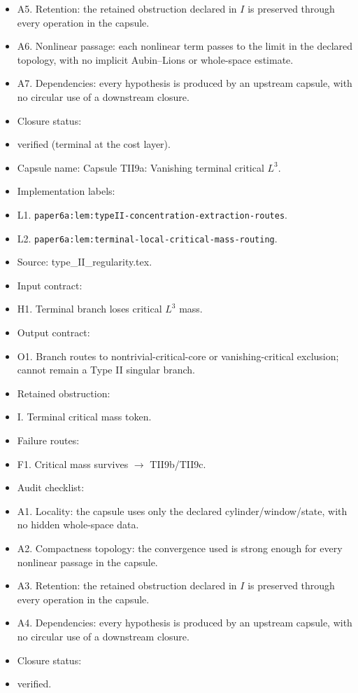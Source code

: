 \documentclass[11pt]{amsart}
\begin{document}
\begin{itemize}
  \item A5. Retention: the retained obstruction declared in $I$ is preserved through every operation in the capsule.
  \item A6. Nonlinear passage: each nonlinear term passes to the limit in the declared topology, with no implicit Aubin--Lions or whole-space estimate.
  \item A7. Dependencies: every hypothesis is produced by an upstream capsule, with no circular use of a downstream closure.
  \item Closure status:
  \item verified (terminal at the cost layer).
\end{itemize}

\begin{itemize}
  \item Capsule name: Capsule TII9a: Vanishing terminal critical $L^3$.
  \item Implementation labels:
  \item L1. \texttt{paper6a:lem:typeII-concentration-extraction-routes}.
  \item L2. \texttt{paper6a:lem:terminal-local-critical-mass-routing}.
  \item Source: type\_II\_regularity.tex.
  \item Input contract:
  \item H1. Terminal branch loses critical $L^3$ mass.
  \item Output contract:
  \item O1. Branch routes to nontrivial-critical-core or vanishing-critical exclusion; cannot remain a Type II singular branch.
  \item Retained obstruction:
  \item I. Terminal critical mass token.
  \item Failure routes:
  \item F1. Critical mass survives $\to$ TII9b/TII9c.
  \item Audit checklist:
  \item A1. Locality: the capsule uses only the declared cylinder/window/state, with no hidden whole-space data.
  \item A2. Compactness topology: the convergence used is strong enough for every nonlinear passage in the capsule.
  \item A3. Retention: the retained obstruction declared in $I$ is preserved through every operation in the capsule.
  \item A4. Dependencies: every hypothesis is produced by an upstream capsule, with no circular use of a downstream closure.
  \item Closure status:
  \item verified.
\end{itemize}
\end{document}
